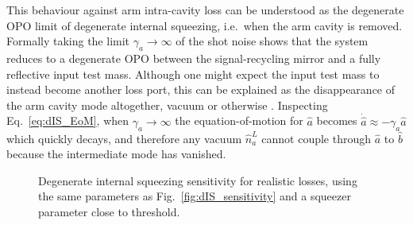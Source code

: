 This behaviour against arm intra-cavity loss can be understood as the degenerate OPO limit of degenerate internal squeezing, i.e.\ when the arm cavity is removed. Formally taking the limit $\gamma_a\rightarrow\infty$ of the shot noise shows that the system reduces to a degenerate OPO between the signal-recycling mirror and a fully reflective input test mass.  Although one might expect the input test mass to instead become another loss port, this can be explained as the disappearance of the arm cavity mode altogether, vacuum or otherwise . Inspecting Eq.~\ref{eq:dIS_EoM}, when $\gamma_a\rightarrow\infty$ the equation-of-motion for $\hat a$ becomes $\dot{\hat a}\approx -\gamma_a \hat a$ which quickly decays, and therefore any vacuum $\hat n^L_a$ cannot couple through $\hat a$ to $\hat b$ because the intermediate mode has vanished.


\begin{figure}
	\centering
	\caption{Degenerate internal squeezing sensitivity for realistic losses, using the same parameters as Fig.~\ref{fig:dIS_sensitivity} and a squeezer parameter close to threshold. }
	\label{fig:dIS_realistic_loss}
\end{figure}

